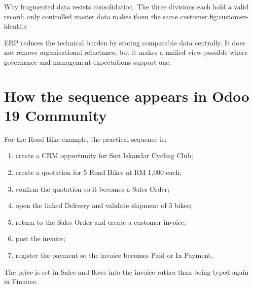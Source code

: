 \begin{utpfig}{Why fragmented data resists
consolidation. The three divisions each hold a valid record; only controlled
master data makes them the same customer.}{fig:customer-identity}
\end{utpfig}

ERP reduces the technical burden by storing comparable data centrally. It does
not remove organisational reluctance, but it makes a unified view possible where
governance and management expectations support one.

\section{How the sequence appears in Odoo 19 Community}

\begin{applicationbox}
For the Road Bike example, the practical sequence is:
\begin{enumerate}
  \item create a CRM opportunity for Seri Iskandar Cycling Club;
  \item create a quotation for 5 Road Bikes at RM 1,000 each;
  \item confirm the quotation so it becomes a Sales Order;
  \item open the linked Delivery and validate shipment of 5 bikes;
  \item return to the Sales Order and create a customer invoice;
  \item post the invoice;
  \item register the payment so the invoice becomes Paid or In Payment.
\end{enumerate}
The price is set in Sales and flows into the invoice rather than being typed
again in Finance.
\end{applicationbox}

